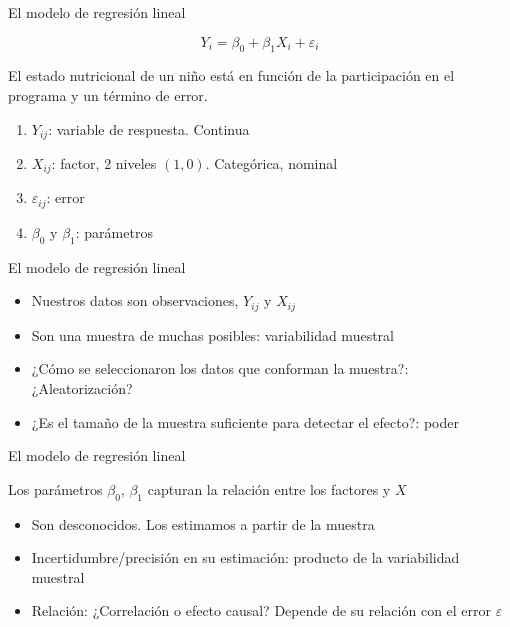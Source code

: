 \documentclass{beamer}
\begin{document}
\begin{frame}{El modelo de regresión lineal}

\begin{equation*}
    Y_{i}=\beta_0+\beta_1X_i+\varepsilon_i
\end{equation*}

El estado nutricional de un niño está en función de la participación en el programa y un término de error. 

\begin{enumerate}
    \item $Y_{ij}$: variable de respuesta. Continua
    \item $X_{ij}$: factor, 2 niveles $(1,0)$. Categórica, nominal
    \item $\varepsilon_{ij}$: error
    \item $\beta_0$ y $\beta_1$: parámetros
\end{enumerate}
    
\end{frame}

\begin{frame}{El modelo de regresión lineal}

\begin{itemize}
    \item Nuestros datos son observaciones, $Y_{ij}$ y $X_{ij}$
    \item Son una muestra de muchas posibles: variabilidad muestral
    \item ¿Cómo se seleccionaron los datos que conforman la muestra?: ¿Aleatorización?
    \item ¿Es el tamaño de la muestra suficiente para detectar el efecto?: poder
\end{itemize}
    
\end{frame}

\begin{frame}{El modelo de regresión lineal}

Los parámetros $\beta_0$, $\beta_1$ capturan la relación entre los factores y $X$

\begin{itemize}
    \item Son desconocidos. Los estimamos a partir de la muestra
    \item Incertidumbre/precisión en su estimación: producto de la variabilidad muestral
    \item Relación: ¿Correlación o efecto causal? Depende de su relación con el error $\varepsilon$
\end{itemize}
    
\end{frame}
\end{document}
